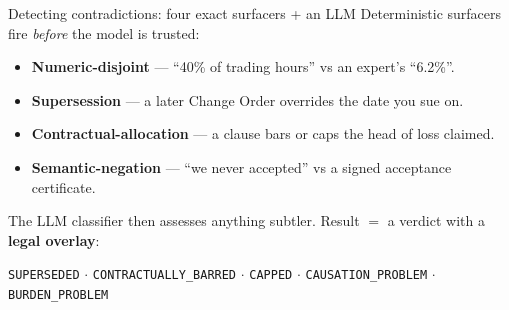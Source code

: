 \documentclass[aspectratio=169,10pt]{beamer}
\begin{document}
\begin{frame}{Detecting contradictions: four exact surfacers + an LLM}
  Deterministic surfacers fire \emph{before} the model is trusted:
  \begin{itemize}
    \item \textbf{Numeric-disjoint} --- ``40\% of trading hours'' vs an expert's
          ``6.2\%''.
    \item \textbf{Supersession} --- a later Change Order overrides the date you
          sue on.
    \item \textbf{Contractual-allocation} --- a clause bars or caps the head of
          loss claimed.
    \item \textbf{Semantic-negation} --- ``we never accepted'' vs a signed
          acceptance certificate.
  \end{itemize}
  \medskip
  The LLM classifier then assesses anything subtler. Result $=$ a verdict with a
  \textbf{legal overlay}:
  \begin{center}
    \footnotesize
    \texttt{SUPERSEDED} $\cdot$ \texttt{CONTRACTUALLY\_BARRED} $\cdot$
    \texttt{CAPPED} $\cdot$ \texttt{CAUSATION\_PROBLEM} $\cdot$
    \texttt{BURDEN\_PROBLEM}
  \end{center}
\end{frame}
\end{document}
